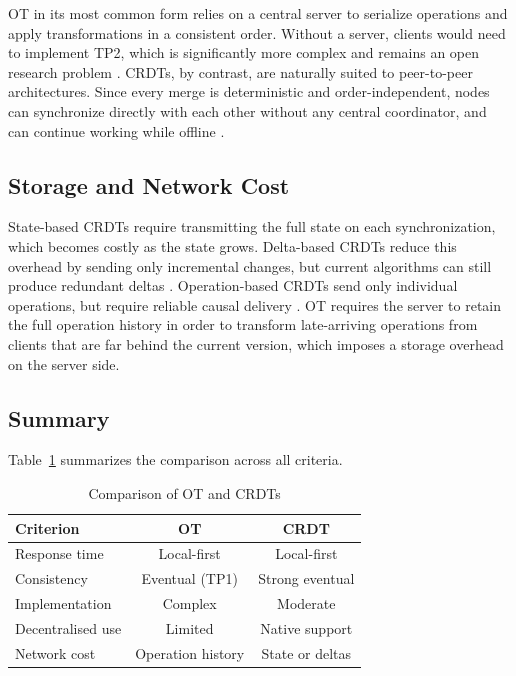 OT in its most common form relies on a central server to serialize operations and apply
transformations in a consistent order. Without a server, clients would need to implement TP2, which
is significantly more complex and remains an open research problem \cite{ellis1989concurrency}.
CRDTs, by contrast, are naturally suited to peer-to-peer architectures. Since every merge is
deterministic and order-independent, nodes can synchronize directly with each other without any
central coordinator, and can continue working while offline \cite{automerge2024, nicolaescu2015}.

\subsection{Storage and Network Cost}

State-based CRDTs require transmitting the full state on each synchronization, which becomes costly
as the state grows. Delta-based CRDTs reduce this overhead by sending only incremental changes, but
current algorithms can still produce redundant deltas \cite{Stateful_delta}. Operation-based CRDTs
send only individual operations, but require reliable causal delivery \cite{sending_order}.
OT requires the server to retain the full operation history in order to transform late-arriving
operations from clients that are far behind the current version, which imposes a storage overhead
on the server side.

\subsection{Summary}

Table~\ref{tab:comparison} summarizes the comparison across all criteria.

\begin{table}[h]
\caption{Comparison of OT and CRDTs}
\label{tab:comparison}
\begin{tabular}{|l|c|c|}
\hline
\textbf{Criterion} & \textbf{OT} & \textbf{CRDT} \\
\hline
Response time       & Local-first & Local-first \\
\hline
Consistency         & Eventual (TP1) & Strong eventual \\
\hline
Implementation      & Complex & Moderate \\
\hline
Decentralised use   & Limited & Native support \\
\hline
Network cost        & Operation history & State or deltas \\
\hline
\end{tabular}
\end{table}
